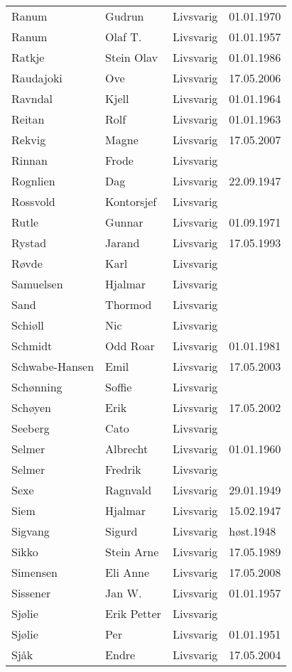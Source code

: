 \documentclass[fsbok.tex]{subfiles}
\begin{document}
\begin{longtable}{llll}
Ranum	&	Gudrun	&	Livsvarig 	&	01.01.1970	\\
Ranum	&	Olaf T.	&	Livsvarig 	&	01.01.1957	\\
Ratkje	&	Stein Olav	&	Livsvarig 	&	01.01.1986	\\
Raudajoki	&	Ove	&	Livsvarig	&	17.05.2006	\\
Ravndal	&	Kjell	&	Livsvarig 	&	01.01.1964	\\
Reitan	&	Rolf	&	Livsvarig 	&	01.01.1963	\\
Rekvig	&	Magne	&	Livsvarig	&	17.05.2007	\\
Rinnan	&	Frode	&	Livsvarig 	&		\\
Rognlien	&	Dag	&	Livsvarig 	&	22.09.1947	\\
Rossvold	&	Kontorsjef	&	Livsvarig 	&		\\
Rutle	&	Gunnar	&	Livsvarig 	&	01.09.1971	\\
Rystad	&	Jarand	&	Livsvarig 	&	17.05.1993	\\
Røvde	&	Karl	&	Livsvarig 	&		\\
Samuelsen	&	Hjalmar	&	Livsvarig 	&		\\
Sand	&	Thormod	&	Livsvarig 	&		\\
Schiøll	&	Nic	&	Livsvarig 	&		\\
Schmidt	&	Odd Roar	&	Livsvarig 	&	01.01.1981	\\
Schwabe-Hansen 	&	Emil	&	Livsvarig	&	17.05.2003	\\
Schønning	&	Soffie	&	Livsvarig 	&		\\
Schøyen 	&	Erik	&	Livsvarig	&	17.05.2002	\\
Seeberg	&	Cato	&	Livsvarig 	&		\\
Selmer	&	Albrecht	&	Livsvarig 	&	01.01.1960	\\
Selmer	&	Fredrik	&	Livsvarig 	&		\\
Sexe	&	Ragnvald	&	Livsvarig 	&	29.01.1949	\\
Siem	&	Hjalmar	&	Livsvarig 	&	15.02.1947	\\
Sigvang	&	Sigurd	&	Livsvarig	&	høst.1948	\\
Sikko	&	Stein Arne	&	Livsvarig 	&	17.05.1989	\\
Simensen	&	Eli Anne	&	Livsvarig	&	17.05.2008	\\
Sissener	&	Jan W.	&	Livsvarig 	&	01.01.1957	\\
Sjølie	&	Erik Petter	&	Livsvarig 	&		\\
Sjølie	&	Per	&	Livsvarig 	&	01.01.1951	\\
Sjåk 	&	Endre	&	Livsvarig	&	17.05.2004	\\

\end{longtable}
\end{document}
